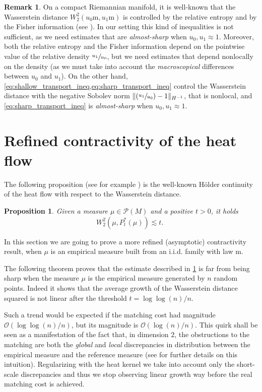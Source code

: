 \documentclass[JEP,XML,SOM,Unicode]{cedram}
\newcommand{\Psfrac}[2]{(\sfrac{#1}{#2})}
\newcounter{results}[section]
\theoremstyle{plain}
\newtheorem{proposition}[results]{Proposition}
\theoremstyle{definition}
\newtheorem{remark}[results]{Remark}
\numberwithin{equation}{section}
\newcommand{\bigo}{\ensuremath{\mathcal{O}}}
\newcommand{\prob}{\ensuremath{\mathcal{P}}}
\newcommand{\fullstop}{\ensuremath{\text{. }}}
\newcommand{\m}{\ensuremath{\mathrm m}}
\DeclarePairedDelimiter\norm{\lVert}{\rVert}
\begin{document}
\begin{remark}
On a compact Riemannian manifold, it is well-known that the Wasserstein distance $W_2^2(u_0\m, u_1\m)$ is controlled by the relative entropy and by the Fisher information (see \cite{Otto-Villani00}). In our setting this kind of inequalities is not sufficient, as we need estimates that are \emph{almost-sharp} when $u_0, u_1\approx 1$. Moreover, both the relative entropy and the Fisher information depend on the pointwise value of the relative density $\sfrac{u_1}{u_0}$, but we need estimates that depend nonlocally on the density (as we must take into account the \emph{macroscopical} differences between $u_0$ and $u_1$). On the other hand, \cref{eq:shallow_transport_ineq,eq:sharp_transport_ineq} control the Wasserstein distance with the negative Sobolev norm $\norm{\Psfrac{u_1}{u_0}-1}_{H^{-1}}$, that is nonlocal, and \cref{eq:sharp_transport_ineq} is \emph{almost-sharp} when $u_0,u_1\approx 1$.
\end{remark}

\section{Refined contractivity of the heat flow}\label{sec:extreme_contractivity}
The following proposition (see for example \cite[Th.\,3]{ErbarKuwadaSturm2015}) is the well-known Hölder continuity of the heat flow with respect
to the Wasserstein distance.
\begin{proposition}\label{prop:heat_holder}
Given a measure $\mu\in \prob(M)$ and a positive $t>0$, it holds
\begin{equation*}
W_2^2(\mu, P_t^*(\mu)) \lesssim t \fullstop
\end{equation*}
\end{proposition}
In this section we are going to prove a more refined (asymptotic) contractivity result, when $\mu$ is
an empirical measure built from an i.i.d. family with law $\m$.

The following theorem proves that the estimate described in
\cref{prop:heat_holder} is far from being sharp when the measure $\mu$ is the empirical measure
generated by $n$ random points. Indeed it shows that the average growth of the Wasserstein distance squared
is not linear after the threshold $t = \log\log(n)/n$.

Such a trend would be expected if the matching cost had magnitude $\bigo(\log\log(n)/n)$, but its magnitude is
$\bigo(\log(n)/n)$. This quirk shall be seen as a manifestation of the fact that, in dimension $2$, the
obstructions to the matching are both the \emph{global} and \emph{local} discrepancies in distribution
between the empirical measure and the reference measure (see \cite[\S4.2]{Talagrand14} for further
details on this intuition). Regularizing with the heat kernel we take into account only
the short-scale discrepancies and thus we stop observing linear growth way before the real matching cost is
achieved.
\end{document}
